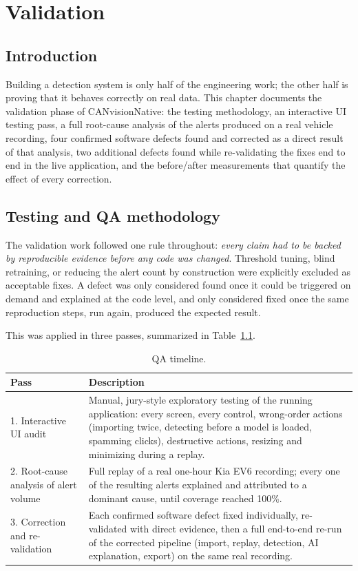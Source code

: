 \chapter{Validation}
\label{chap:validation}

\section{Introduction}

Building a detection system is only half of the engineering work; the other half is proving that it behaves correctly on real data. This chapter documents the validation phase of CANvisionNative: the testing methodology, an interactive UI testing pass, a full root-cause analysis of the alerts produced on a real vehicle recording, four confirmed software defects found and corrected as a direct result of that analysis, two additional defects found while re-validating the fixes end to end in the live application, and the before/after measurements that quantify the effect of every correction.

\section{Testing and QA methodology}

The validation work followed one rule throughout: \emph{every claim had to be backed by reproducible evidence before any code was changed}. Threshold tuning, blind retraining, or reducing the alert count by construction were explicitly excluded as acceptable fixes. A defect was only considered found once it could be triggered on demand and explained at the code level, and only considered fixed once the same reproduction steps, run again, produced the expected result.

This was applied in three passes, summarized in Table~\ref{tab:qa-timeline}.

\begin{table}[H]
\centering
\caption{QA timeline.}
\label{tab:qa-timeline}
\begin{tabularx}{\textwidth}{@{}lX@{}}
\toprule
\textbf{Pass} & \textbf{Description} \\
\midrule
1. Interactive UI audit & Manual, jury-style exploratory testing of the running application: every screen, every control, wrong-order actions (importing twice, detecting before a model is loaded, spamming clicks), destructive actions, resizing and minimizing during a replay. \\
2. Root-cause analysis of alert volume & Full replay of a real one-hour Kia EV6 recording; every one of the resulting alerts explained and attributed to a dominant cause, until coverage reached 100\%. \\
3. Correction and re-validation & Each confirmed software defect fixed individually, re-validated with direct evidence, then a full end-to-end re-run of the corrected pipeline (import, replay, detection, AI explanation, export) on the same real recording. \\
\bottomrule
\end{tabularx}
\end{table}

